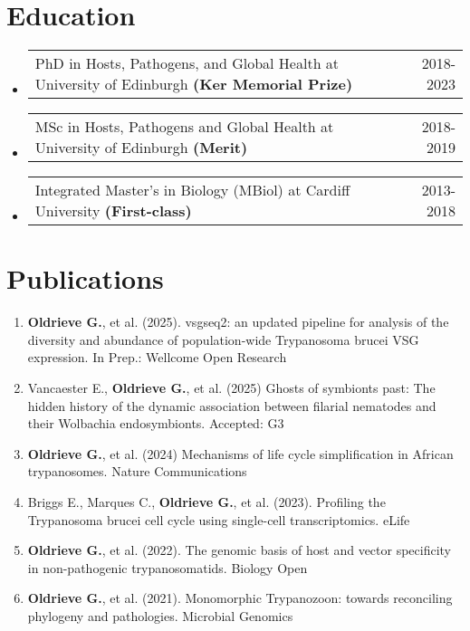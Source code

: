 \documentclass[a4paper,11pt]{article}
\begin{document}
\section{Education}
\begin{itemize}[leftmargin=1.2em, itemsep=3pt, label=-]
\item \begin{tabularx}{\linewidth}{@{}X r@{}}
PhD in Hosts, Pathogens, and Global Health at University of Edinburgh \textbf{(Ker Memorial Prize)} & 2018-2023 \\
\end{tabularx}
\item \begin{tabularx}{\linewidth}{@{}X r@{}}
MSc in Hosts, Pathogens and Global Health at University of Edinburgh \textbf{(Merit)} & 2018-2019 \\
\end{tabularx}
\item \begin{tabularx}{\linewidth}{@{}X r@{}}
Integrated Master's in Biology (MBiol) at Cardiff University \textbf{(First-class)} & 2013-2018 \\
\end{tabularx}
\end{itemize}

\section{Publications}
\begin{enumerate}[leftmargin=1.2em, itemsep=3pt]
\item \textbf{Oldrieve G.}, et al. (2025). vsgseq2: an updated pipeline for analysis of the diversity and abundance of population-wide Trypanosoma brucei VSG expression. In Prep.: Wellcome Open Research
\item Vancaester E., \textbf{Oldrieve G.}, et al. (2025) Ghosts of symbionts past: The hidden history of the dynamic association between filarial nematodes and their Wolbachia endosymbionts. Accepted: G3
\item \textbf{Oldrieve G.}, et al. (2024) Mechanisms of life cycle simplification in African trypanosomes. Nature Communications
\item Briggs E., Marques C., \textbf{Oldrieve G.}, et al. (2023). Profiling the Trypanosoma brucei cell cycle using single-cell transcriptomics. eLife
\item \textbf{Oldrieve G.}, et al. (2022). The genomic basis of host and vector specificity in non-pathogenic trypanosomatids. Biology Open
\item \textbf{Oldrieve G.}, et al. (2021). Monomorphic Trypanozoon: towards reconciling phylogeny and pathologies. Microbial Genomics
\end{enumerate}
\end{document}
